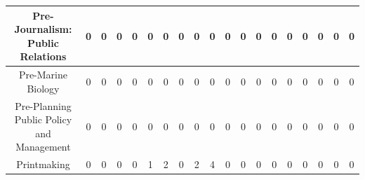 \documentclass[10pt]{article}
\begin{document}
\begin{landscape}
\begin{longtable}[c]{|ccccccccccccccccccc|}
	\multicolumn{1}{|c|}{Pre-Journalism: Public Relations}           & \multicolumn{1}{c|}{0}          & \multicolumn{1}{c|}{0}          & \multicolumn{1}{c|}{0}          & \multicolumn{1}{c|}{0}          & \multicolumn{1}{c|}{0}          & \multicolumn{1}{c|}{0}          & \multicolumn{1}{c|}{0}          & \multicolumn{1}{c|}{0}          & \multicolumn{1}{c|}{0}          & \multicolumn{1}{c|}{0}          & \multicolumn{1}{c|}{0}          & \multicolumn{1}{c|}{0}          & \multicolumn{1}{c|}{0}          & \multicolumn{1}{c|}{0}          & \multicolumn{1}{c|}{0}          & \multicolumn{1}{c|}{0}          & \multicolumn{1}{c|}{0}          & 0          \\ \hline
	\multicolumn{1}{|c|}{Pre-Marine Biology}                         & \multicolumn{1}{c|}{0}          & \multicolumn{1}{c|}{0}          & \multicolumn{1}{c|}{0}          & \multicolumn{1}{c|}{0}          & \multicolumn{1}{c|}{0}          & \multicolumn{1}{c|}{0}          & \multicolumn{1}{c|}{0}          & \multicolumn{1}{c|}{0}          & \multicolumn{1}{c|}{0}          & \multicolumn{1}{c|}{0}          & \multicolumn{1}{c|}{0}          & \multicolumn{1}{c|}{0}          & \multicolumn{1}{c|}{0}          & \multicolumn{1}{c|}{0}          & \multicolumn{1}{c|}{0}          & \multicolumn{1}{c|}{0}          & \multicolumn{1}{c|}{0}          & 0          \\ \hline
	\multicolumn{1}{|c|}{Pre-Planning Public Policy and Management}  & \multicolumn{1}{c|}{0}          & \multicolumn{1}{c|}{0}          & \multicolumn{1}{c|}{0}          & \multicolumn{1}{c|}{0}          & \multicolumn{1}{c|}{0}          & \multicolumn{1}{c|}{0}          & \multicolumn{1}{c|}{0}          & \multicolumn{1}{c|}{0}          & \multicolumn{1}{c|}{0}          & \multicolumn{1}{c|}{0}          & \multicolumn{1}{c|}{0}          & \multicolumn{1}{c|}{0}          & \multicolumn{1}{c|}{0}          & \multicolumn{1}{c|}{0}          & \multicolumn{1}{c|}{0}          & \multicolumn{1}{c|}{0}          & \multicolumn{1}{c|}{0}          & 0          \\ \hline
	\multicolumn{1}{|c|}{Printmaking}                                & \multicolumn{1}{c|}{0}          & \multicolumn{1}{c|}{0}          & \multicolumn{1}{c|}{0}          & \multicolumn{1}{c|}{0}          & \multicolumn{1}{c|}{1}          & \multicolumn{1}{c|}{2}          & \multicolumn{1}{c|}{0}          & \multicolumn{1}{c|}{2}          & \multicolumn{1}{c|}{4}          & \multicolumn{1}{c|}{0}          & \multicolumn{1}{c|}{0}          & \multicolumn{1}{c|}{0}          & \multicolumn{1}{c|}{0}          & \multicolumn{1}{c|}{0}          & \multicolumn{1}{c|}{0}          & \multicolumn{1}{c|}{0}          & \multicolumn{1}{c|}{0}          & 0          \\ \hline

\end{longtable}
\end{landscape}
\end{document}
